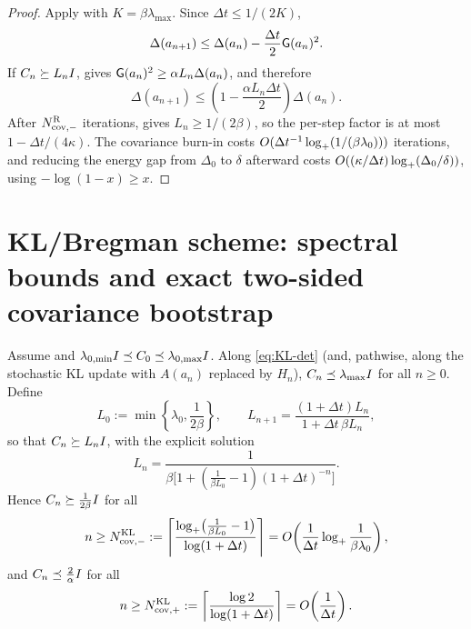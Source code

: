 \begin{proof}
Apply  with $K=\beta\lambda_{\max}$.  Since
$\Delta t\leq1/(2K)$,
\[
    \Delta(a_{n+1})
    \leq
    \Delta(a_n)-\frac{\Delta t}{2}\mathsf{G}(a_n)^2.
\]
If $C_n\succeq L_nI$,  gives
$\mathsf{G}(a_n)^2\geq\alpha L_n\Delta(a_n)$, and therefore
\[
    \Delta(a_{n+1})
    \leq
    \left(1-\frac{\alpha L_n\Delta t}{2}\right)\Delta(a_n).
\]
After $N_{\mathrm{cov},-}^{\mathrm{R}}$ iterations,  gives
$L_n\geq1/(2\beta)$, so the per-step factor is at most
$1-\Delta t/(4\kappa)$.  The covariance burn-in costs
$O(\Delta t^{-1}\log_+(1/(\beta\lambda_0)))$ iterations, and reducing the energy gap from
$\Delta_0$ to $\delta$ afterward costs
$O((\kappa/\Delta t)\log_+(\Delta_0/\delta))$, using
$-\log(1-x)\geq x$.
\end{proof}

\section{KL/Bregman scheme: spectral bounds and exact two-sided covariance bootstrap}

\begin{lemma}
\label{lem:KL-cov}
Assume  and $\lambda_{0,\min}I\preceq C_0\preceq\lambda_{0,\max}I$.
Along \eqref{eq:KL-det} (and, pathwise, along the stochastic KL update with $A(a_n)$
replaced by $H_n$), $C_n\preceq\lambda_{\max}I$ for all $n\geq0$. Define
\[
    L_0:=\min\left\{\lambda_0,\frac1{2\beta}\right\},
    \qquad
    L_{n+1}=\frac{(1+\Delta t)L_n}{1+\Delta t\,\beta L_n},
\]
so that $C_n\succeq L_nI$, with the explicit solution
\[
    L_n
    =
    \frac1{\beta\bigl[1+(\tfrac1{\beta L_0}-1)(1+\Delta t)^{-n}\bigr]} .
\]
Hence $C_n\succeq\tfrac1{2\beta}I$ for all
\[
    n\geq
    N_{\mathrm{cov},-}^{\mathrm{KL}}
    :=
    \left\lceil
        \frac{\log_+\bigl(\tfrac1{\beta L_0}-1\bigr)}{\log(1+\Delta t)}
    \right\rceil
    =
    O\!\left(\frac1{\Delta t}\log_+\frac1{\beta\lambda_0}\right),
\]
and $C_n\preceq\tfrac2\alpha I$ for all
\[
    n\geq
    N_{\mathrm{cov},+}^{\mathrm{KL}}
    :=
    \left\lceil\frac{\log2}{\log(1+\Delta t)}\right\rceil
    =
    O\!\left(\frac1{\Delta t}\right).
\]
\end{lemma}

